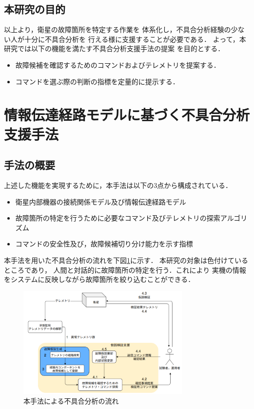 \documentclass[11pt]{jsarticle}%
\begin{document}
\begin{multicols}{2}
\subsection{本研究の目的}
\vspace{-1zh}
以上より，衛星の故障箇所を特定する作業を
体系化し，不具合分析経験の少ない人が十分に不具合分析を
行える様に支援することが必要である．
よって，本研究では以下の機能を満たす不具合分析支援手法の提案%
を目的とする．%
  \begin{itemize}
  \item 故障候補を確認するためのコマンドおよびテレメトリを提案する．
  \item コマンドを選ぶ際の判断の指標を定量的に提示する．
\end{itemize}

\vspace{-1zh}
\section{情報伝達経路モデルに基づく不具合分析支援手法}
\vspace{-1zh}
\subsection{手法の概要}
\vspace{-1zh}
上述した機能を実現するために，本手法は以下の3点から構成されている．
\begin{itemize} %
  \item 衛星内部機器の接続関係モデル及び情報伝達経路モデル
  \item 故障箇所の特定を行うために必要なコマンド及びテレメトリの探索アルゴリズム%
  \item コマンドの安全性及び，故障候補切り分け能力を示す指標
\end{itemize}
本手法を用いた不具合分析の流れを下図\ref{fig:fault_diagnosis_flow}に示す．
本研究の対象は色付けているところであり，%
人間と対話的に故障箇所の特定を行う．これにより %
実機の情報をシステムに反映しながら故障箇所を絞り込むことができる．
\begin{figure}[H]
  \centering
    \includegraphics[height=5.6cm]{../figure/fault_diagnosis_flow.png}
    \caption{本手法による不具合分析の流れ}
    \label{fig:fault_diagnosis_flow}
\end{figure}


\end{multicols}
\end{document}
